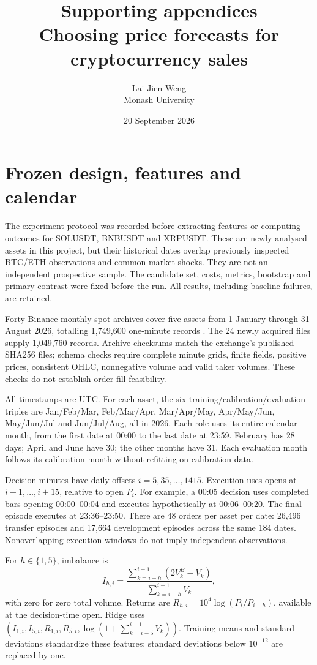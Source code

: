 \documentclass[11pt]{article}
\title{Supporting appendices\\Choosing price forecasts for cryptocurrency sales}
\author{Lai Jien Weng\\Monash University}\date{20 September 2026}
\begin{document}
\maketitle\appendix
\section{Frozen design, features and calendar}
The experiment protocol was recorded before extracting features or computing outcomes for SOLUSDT, BNBUSDT and XRPUSDT. These are newly analysed assets in this project, but their historical dates overlap previously inspected BTC/ETH observations and common market shocks. They are not an independent prospective sample. The candidate set, costs, metrics, bootstrap and primary contrast were fixed before the run. All results, including baseline failures, are retained.

Forty Binance monthly spot archives cover five assets from 1 January through 31 August 2026, totalling 1,749,600 one-minute records \citep{binance2026}. The 24 newly acquired files supply 1,049,760 records. Archive checksums match the exchange's published SHA256 files; schema checks require complete minute grids, finite fields, positive prices, consistent OHLC, nonnegative volume and valid taker volumes. These checks do not establish order fill feasibility.

All timestamps are UTC. For each asset, the six training/calibration/evaluation triples are Jan/Feb/Mar, Feb/Mar/Apr, Mar/Apr/May, Apr/May/Jun, May/Jun/Jul and Jun/Jul/Aug, all in 2026. Each role uses its entire calendar month, from the first date at 00:00 to the last date at 23:59. February has 28 days; April and June have 30; the other months have 31. Each evaluation month follows its calibration month without refitting on calibration data.

Decision minutes have daily offsets $i=5,35,\ldots,1415$. Execution uses opens at $i+1,\ldots,i+15$, relative to open $P_i$. For example, a 00:05 decision uses completed bars opening 00:00--00:04 and executes hypothetically at 00:06--00:20. The final episode executes at 23:36--23:50. There are 48 orders per asset per date: 26,496 transfer episodes and 17,664 development episodes across the same 184 dates. Nonoverlapping execution windows do not imply independent observations.

For $h\in\{1,5\}$, imbalance is
\[
I_{h,i}=\frac{\sum_{k=i-h}^{i-1}(2V^B_k-V_k)}{\sum_{k=i-h}^{i-1}V_k},
\]
with zero for zero total volume. Returns are $R_{h,i}=10^4\log(P_i/P_{i-h})$, available at the decision-time open. Ridge uses $(I_{1,i},I_{5,i},R_{1,i},R_{5,i},\log(1+\sum_{k=i-5}^{i-1}V_k))$. Training means and standard deviations standardize these features; standard deviations below $10^{-12}$ are replaced by one.
\end{document}
